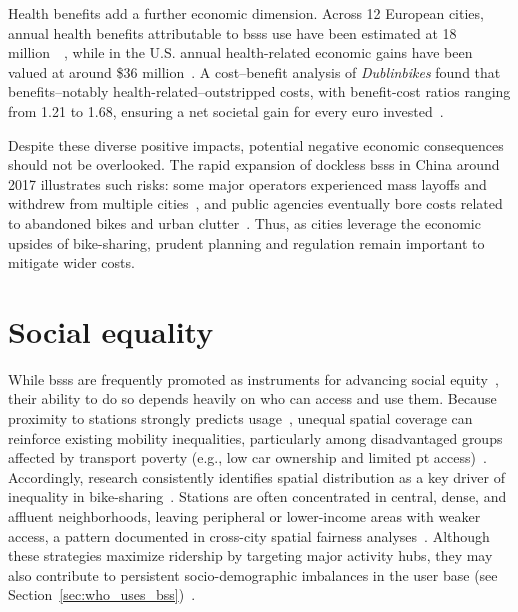 Health benefits add a further economic dimension. Across 12 European cities, annual health benefits attributable to \acp{bss} use have been estimated at 18 million~\texteuro{}~\cite{Otero2018}, while in the U.S. annual health-related economic gains have been valued at around \$36 million~\cite{Clockston2021}. A cost--benefit analysis of \textit{Dublinbikes} found that benefits--notably health-related--outstripped costs, with benefit-cost ratios ranging from 1.21 to 1.68, ensuring a net societal gain for every euro invested~\cite{Murphy2015}.

Despite these diverse positive impacts, potential negative economic consequences should not be overlooked. The rapid expansion of dockless \acp{bss} in China around 2017 illustrates such risks: some major operators experienced mass layoffs and withdrew from multiple cities~\cite{Fortune2017, BusinessInsider2018}, and public agencies eventually bore costs related to abandoned bikes and urban clutter~\cite{Chen2019}. Thus, as cities leverage the economic upsides of bike-sharing, prudent planning and regulation remain important to mitigate wider costs.

\section{Social equality}

While \acp{bss} are frequently promoted as instruments for advancing social equity~\cite{Shaheen2010}, their ability to do so depends heavily on who can access and use them. Because proximity to stations strongly predicts usage~\cite{Kabra2018, BachandMarleau2012}, unequal spatial coverage can reinforce existing mobility inequalities, particularly among disadvantaged groups affected by transport poverty (e.g., low car ownership and limited \ac{pt} access)~\cite{Lucas2016}. Accordingly, research consistently identifies spatial distribution as a key driver of inequality in bike-sharing~\cite{Teixeira2021, Goodman2014, Ogilvie2012}. Stations are often concentrated in central, dense, and affluent neighborhoods, leaving peripheral or lower-income areas with weaker access, a pattern documented in cross-city spatial fairness analyses~\cite{DuranRodas2020}. Although these strategies maximize ridership by targeting major activity hubs, they may also contribute to persistent socio-demographic imbalances in the user base (see Section~\ref{sec:who_uses_bss})~\cite{Ogilvie2012, Woodcock2014, Ricci2015}.

